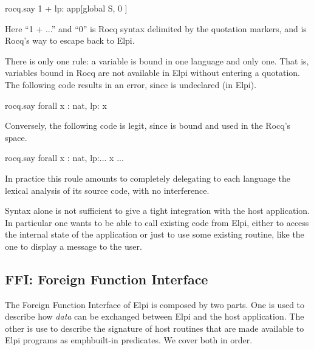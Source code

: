 \documentclass[a4paper, 11pt]{book}
\begin{document}
\begin{elpicode}
  rocq.say {{ 1 + lp:{{ app[global S, {{ 0  }} ]  }}    }}
\end{elpicode}

\noindent
Here ``1 + ...'' and ``0'' is Rocq syntax delimited by
the quotation markers, and  is Rocq's way
to escape back to Elpi.

There is only one rule: a variable is bound in one language and only
one. That is, variables bound in Rocq are not available in Elpi without
entering a quotation. The following code results in an error, since
 is undeclared (in Elpi).

\begin{elpicode}
  rocq.say {{ forall x : nat, lp:{{ x }} }}
\end{elpicode}

\noindent
Conversely, the following code is legit, since  is bound and
used in the Rocq's space.

\begin{elpicode}
  rocq.say {{ forall x : nat, lp:{{... {{ x }} ...}} }}
\end{elpicode}

\noindent
In practice this roule amounts to completely delegating to each language
the lexical analysis of its source code, with no interference.

Syntax alone is not sufficient to give a tight integration with the
host application. In particular one wants to be able to call
existing code from Elpi, either to access the internal state of the
application or just to use some existing routine, like
the  one to display a message to the user.

\subsection{FFI: Foreign Function Interface}\label{FFI}

The Foreign Function Interface of Elpi is composed by two parts.
One is used to describe how \emph{data} can be exchanged between
Elpi and the host application. The other is use to describe
the signature of host routines that are made available to Elpi programs
as emph{built-in predicates}. We cover both in order.

\end{document}
